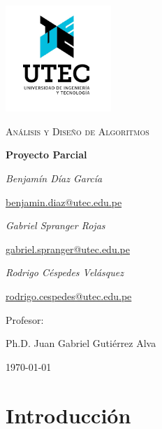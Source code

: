 \documentclass[12pt,a4,paper]{article}
\begin{document}
\begin{titlepage}
	\centering
	\includegraphics[width=0.3\textwidth]{utec2.png}\par\vspace{1cm}
	{\scshape\Large An\'alisis y Diseño de Algoritmos\par}
	\vspace{1.5cm}
	{\huge\bfseries Proyecto Parcial\par}
	\vspace{1.5cm}
	{\Large\itshape Benjamín Díaz García\par}
	\href{mailto:benjamin.diaz@utec.edu.pe}{benjamin.diaz@utec.edu.pe}\\
	\vspace{0.5cm}
	{\Large\itshape Gabriel Spranger Rojas\par}
	\href{mailto:gabriel.spranger@utec.edu.pe}{gabriel.spranger@utec.edu.pe}\\
	\vspace{0.5cm}
	{\Large\itshape Rodrigo C\'espedes Vel\'asquez\par}
	\href{mailto:rodrigo.cespedes@utec.edu.pe}{rodrigo.cespedes@utec.edu.pe}\\
	\vspace{1.5cm}

	\vfill
	Profesor:\par
	Ph.D. Juan Gabriel Gutiérrez Alva

	\vfill
	{\large \today\par}
\end{titlepage}

\newcommand{\algcost}[2]{\strut\hfill\makebox[1.5cm][l]{#1}\makebox[0cm][l]{#2}}

\section*{Introducción}
\end{document}
